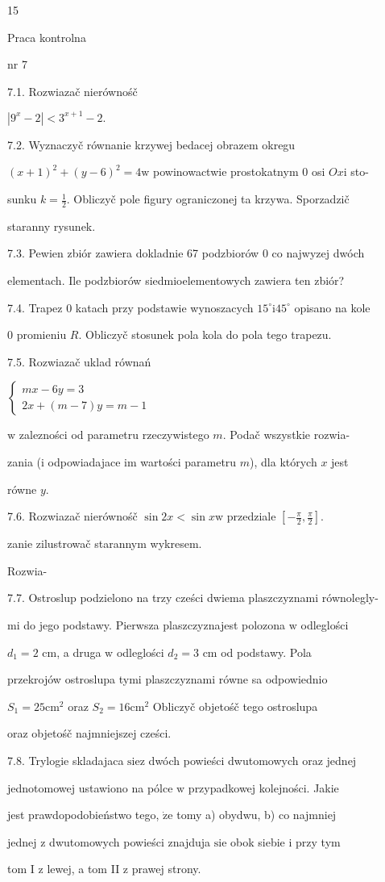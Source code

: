 \documentclass[a4paper,12pt]{article}
\begin{document}
15

Praca kontrolna

nr 7

7.1. Rozwiazač nierównośč

$|9^{x}-2|<3^{x+1}-2.$

7.2. Wyznaczyč równanie krzywej bedacej obrazem okregu

$(x+1)^{2}+(y-6)^{2}=4\mathrm{w}$ powinowactwie prostokatnym $0$ osi $Ox\mathrm{i}$ sto-

sunku $k=\displaystyle \frac{1}{2}$. Obliczyč pole figury ograniczonej ta krzywa. Sporzadzič

staranny rysunek.

7.3. Pewien zbiór zawiera dokladnie 67 podzbiorów $0$ co najwyzej dwóch

elementach. Ile podzbiorów siedmioelementowych zawiera ten zbiór?

7.4. Trapez $0$ katach przy podstawie wynoszacych $15^{\circ}\mathrm{i}45^{\circ}$ opisano na kole

$0$ promieniu $R$. Obliczyč stosunek pola kola do pola tego trapezu.

7.5. Rozwiazač uklad równań

$\left\{\begin{array}{l}
mx-6y=3\\
2x+(m-7)y=m-1
\end{array}\right.$

$\mathrm{w}$ zalezności od parametru rzeczywistego $m$. Podač wszystkie rozwia-

zania ($\mathrm{i}$ odpowiadajace im wartości parametru $m$), dla których $x$ jest

równe $y.$

7.6. Rozwiazač nierównośč $\sin 2x<\sin x\mathrm{w}$ przedziale $[-\displaystyle \frac{\pi}{2},\frac{\pi}{2}]$.

zanie zilustrowač starannym wykresem.

Rozwia-

7.7. Ostroslup podzielono na trzy cześci dwiema plaszczyznami równolegly-

mi do jego podstawy. Pierwsza plaszczyznajest polozona $\mathrm{w}$ odleglości

$d_{1} = 2$ cm, a druga $\mathrm{w}$ odleglości $d_{2} = 3$ cm od podstawy. Pola

przekrojów ostroslupa tymi plaszczyznami równe sa odpowiednio

$S_{1} = 25 \mathrm{c}\mathrm{m}^{2}$ oraz $S_{2} = 16 \mathrm{c}\mathrm{m}^{2}$ Obliczyč objetośč tego ostroslupa

oraz objetośč najmniejszej cześci.

7.8. Trylogie skladajaca $\mathrm{s}\mathrm{i}\mathrm{e} \mathrm{z}$ dwóch powieści dwutomowych oraz jednej

jednotomowej ustawiono na pólce $\mathrm{w}$ przypadkowej kolejności. Jakie

jest prawdopodobieństwo tego, $\dot{\mathrm{z}}\mathrm{e}$ tomy a) obydwu, b) co najmniej

jednej $\mathrm{z}$ dwutomowych powieści znajduja $\mathrm{s}\mathrm{i}\mathrm{e}$ obok siebie $\mathrm{i}$ przy tym

tom I $\mathrm{z}$ lewej, a tom II $\mathrm{z}$ prawej strony.
\end{document}
